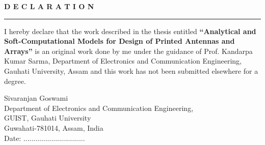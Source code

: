 \begin{center}
{\bf \large D E C L A R A T I O N}
\end{center}
\rule{\linewidth}{2mm} \pagestyle{empty} \vspace{0.25in}
\par

I hereby declare that the work described in the thesis entitled {\bf ``Analytical and Soft-Computational Models for Design of Printed Antennas and Arrays''} is an original work done by me under the guidance of Prof. Kandarpa Kumar Sarma, Department of Electronics and Communication Engineering, Gauhati University, Assam and this work has not been submitted elsewhere for a degree.

\vspace*{30mm}



\bigskip\medskip

\noindent Sivaranjan Goswami\\ Department of Electronics and Communication Engineering, \\ GUIST, Gauhati University\\ Guwahati-781014, Assam, India\\
Date: ............................... \\

\noindent






